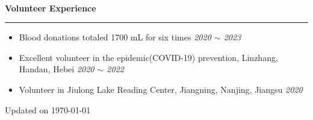 \documentclass[12pt]{article}
\renewcommand*{\section}[1]{
    ~\\ \noindent \textbf{#1} \medskip \hrule \medskip
}
\begin{document}

\section{Volunteer Experience}

\begin{itemize}[noitemsep,nolistsep]
    \item Blood donations totaled 1700 mL for six times \hfill \textit{2020 $\sim$ 2023}
    \item Excellent volunteer in the epidemic(COVID-19) prevention, Linzhang, Handan, Hebei \hfill \textit{2020 $\sim$ 2022}
    \item Volunteer in Jiulong Lake Reading Center, Jiangning, Nanjing, Jiangsu \hfill \textit{2020}
\end{itemize}

\hfill {\tiny Updated on \today}
\end{document}
